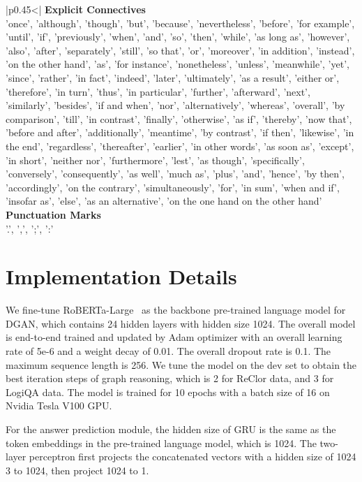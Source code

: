 \documentclass[11pt]{article}
\begin{document}
\begin{table}[bh!]
    \footnotesize
\setlength{\belowcaptionskip}{-0.15cm}
	\begin{tabular}{
|p{}<\centering|
    }
    \hline
    \textbf{Explicit Connectives} \\
    \hline
    'once', 'although', 'though', 'but', 'because', 'nevertheless', 'before', 'for example', 'until', 'if', 'previously', 'when', 'and', 'so', 'then', 'while', 'as long as', 'however', 'also', 'after', 'separately', 'still', 'so that', 'or', 'moreover', 'in addition', 'instead', 'on the other hand', 'as', 'for instance', 'nonetheless', 'unless', 'meanwhile', 'yet', 'since', 'rather', 'in fact', 'indeed', 'later', 'ultimately', 'as a result', 'either or', 'therefore', 'in turn', 'thus', 'in particular', 'further', 'afterward', 'next', 'similarly', 'besides', 'if and when', 'nor', 'alternatively', 'whereas', 'overall', 'by comparison', 'till', 'in contrast', 'finally', 'otherwise', 'as if', 'thereby', 'now that', 'before and after', 'additionally', 'meantime', 'by contrast', 'if then', 'likewise', 'in the end', 'regardless', 'thereafter', 'earlier', 'in other words', 'as soon as', 'except', 'in short', 'neither nor', 'furthermore', 'lest', 'as though', 'specifically', 'conversely', 'consequently', 'as well', 'much as', 'plus', 'and', 'hence', 'by then', 'accordingly', 'on the contrary', 'simultaneously', 'for', 'in sum', 'when and if', 'insofar as', 'else', 'as an alternative', 'on the one hand on the other hand' \\
    \hline\hline
    \textbf{Punctuation Marks} \\
    \hline
    '.', ',', ';', ':' \\
    \hline
    \end{tabular}
    \caption{The discourse delimiter library in our implementation.}
    \label{tab:delimeter}
\end{table}






\section{Implementation Details}
\label{sec:appendix_implementation_details}
We fine-tune RoBERTa-Large~\cite{liu2019roberta} as the backbone pre-trained language model for DGAN, which contains 24 hidden layers with hidden size 1024. 
The overall model is end-to-end trained and updated by Adam \cite{kingma2014adam} optimizer with an overall learning rate of 5e-6 and a weight decay of 0.01. The overall dropout rate is 0.1. The maximum sequence length is 256. 
We tune the model on the dev set to obtain the best iteration steps of graph reasoning, which is 2 for ReClor data, and 3 for LogiQA data.
The model is trained for 10 epochs with a batch size of 16 on Nvidia Tesla V100 GPU.

For the answer prediction module,  the hidden size of GRU is the same as the token embeddings in the pre-trained language model, which is 1024.
The two-layer perceptron first projects the concatenated vectors with a hidden size of 1024  3 to 1024, then project 1024 to 1.
\end{document}
